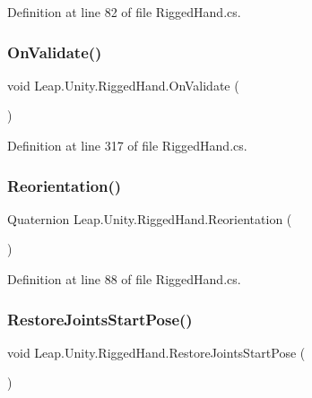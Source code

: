 Definition at line 82 of file Rigged\+Hand.\+cs.

\mbox{\label{class_leap_1_1_unity_1_1_rigged_hand_a375204e4916d600d49dcd6812d08f56e}} 
\subsubsection{\texorpdfstring{OnValidate()}{OnValidate()}}
{\footnotesize\ttfamily void Leap.\+Unity.\+Rigged\+Hand.\+On\+Validate (\begin{DoxyParamCaption}{ }\end{DoxyParamCaption})}



Definition at line 317 of file Rigged\+Hand.\+cs.

\mbox{\label{class_leap_1_1_unity_1_1_rigged_hand_aa4056b463cf5f441e96e1805a609cd6f}} 
\subsubsection{\texorpdfstring{Reorientation()}{Reorientation()}}
{\footnotesize\ttfamily Quaternion Leap.\+Unity.\+Rigged\+Hand.\+Reorientation (\begin{DoxyParamCaption}{ }\end{DoxyParamCaption})}



Definition at line 88 of file Rigged\+Hand.\+cs.

\mbox{\label{class_leap_1_1_unity_1_1_rigged_hand_aad0ba3eb19fbd881af90b7e5b6ffaf7d}} 
\subsubsection{\texorpdfstring{RestoreJointsStartPose()}{RestoreJointsStartPose()}}
{\footnotesize\ttfamily void Leap.\+Unity.\+Rigged\+Hand.\+Restore\+Joints\+Start\+Pose (\begin{DoxyParamCaption}{ }\end{DoxyParamCaption})}


